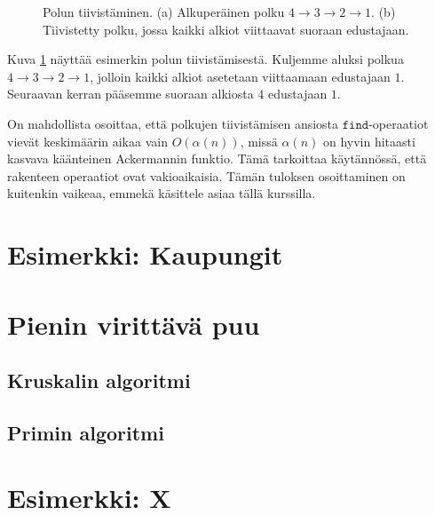 \begin{figure}
\center
\begin{center}
\end{center}
\caption{Polun tiivistäminen. (a) Alkuperäinen polku $4 \rightarrow 3 \rightarrow 2 \rightarrow 1$.
(b) Tiivistetty polku, jossa kaikki alkiot viittaavat suoraan edustajaan.}
\label{fig:poltii}
\end{figure}

Kuva \ref{fig:poltii} näyttää esimerkin polun tiivistämisestä.
Kuljemme aluksi polkua $4 \rightarrow 3 \rightarrow 2 \rightarrow 1$,
jolloin kaikki alkiot asetetaan viittaamaan edustajaan $1$.
Seuraavan kerran pääsemme suoraan alkiosta $4$ edustajaan $1$.

On mahdollista osoittaa, että polkujen tiivistämisen ansiosta
$\texttt{find}$-ope\-raatiot vievät keskimäärin aikaa vain
$O(\alpha(n))$, missä $\alpha(n)$ on hyvin hitaasti kasvava
käänteinen Ackermannin funktio.
Tämä tarkoittaa käytännössä, että rakenteen operaatiot
ovat vakioaikaisia.
Tämän tuloksen osoittaminen on kuitenkin vaikeaa,
emmekä käsittele asiaa tällä kurssilla.


\section{Esimerkki: Kaupungit}

\section{Pienin virittävä puu}

\subsection{Kruskalin algoritmi}

\subsection{Primin algoritmi}

\section{Esimerkki: X}